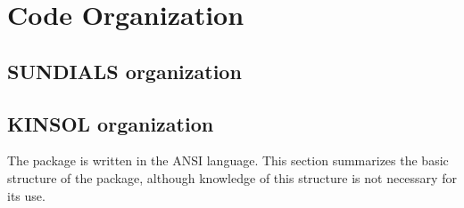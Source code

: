\chapter{Code Organization}\label{s:organization}

\section{SUNDIALS organization}\label{ss:sun_org}


\section{KINSOL organization}\label{ss:kinsol_org}

The {\kinsol} package is written in the ANSI {\CC} language. This section
summarizes the basic structure of the package, although knowledge
of this structure is not necessary for its use.


